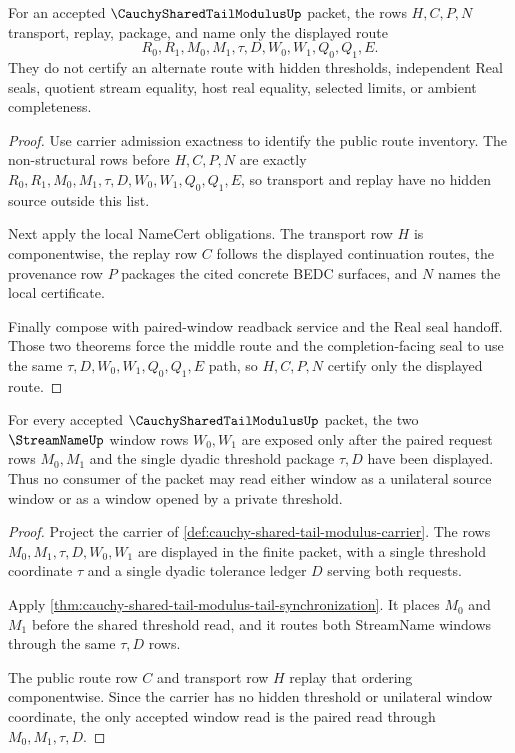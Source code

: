 \begin{theorem}
\label{thm:cauchy-shared-tail-modulus-route-replay-provenance}
For an accepted $\CauchySharedTailModulusUp$ packet, the rows $H,C,P,N$ transport, replay, package, and name only the displayed route
$$
R_0,R_1,M_0,M_1,\tau,D,W_0,W_1,Q_0,Q_1,E.
$$
They do not certify an alternate route with hidden thresholds, independent Real seals, quotient stream equality, host real equality, selected limits, or ambient completeness.
\end{theorem}
\begin{proof}
Use carrier admission exactness to identify the public route inventory. The non-structural rows before $H,C,P,N$ are exactly $R_0,R_1,M_0,M_1,\tau,D,W_0,W_1,Q_0,Q_1,E$, so transport and replay have no hidden source outside this list.

Next apply the local NameCert obligations. The transport row $H$ is componentwise, the replay row $C$ follows the displayed continuation routes, the provenance row $P$ packages the cited concrete BEDC surfaces, and $N$ names the local certificate.

Finally compose with paired-window readback service and the Real seal handoff. Those two theorems force the middle route and the completion-facing seal to use the same $\tau,D,W_0,W_1,Q_0,Q_1,E$ path, so $H,C,P,N$ certify only the displayed route.
\end{proof}

\begin{theorem}
\label{thm:cauchy-shared-tail-modulus-paired-window-obligation}
For every accepted $\CauchySharedTailModulusUp$ packet, the two $\StreamNameUp$ window rows $W_0,W_1$ are exposed only after the paired request rows $M_0,M_1$ and the single dyadic threshold package $\tau,D$ have been displayed. Thus no consumer of the packet may read either window as a unilateral source window or as a window opened by a private threshold.
\end{theorem}
\begin{proof}
Project the carrier of \autoref{def:cauchy-shared-tail-modulus-carrier}. The rows $M_0,M_1,\tau,D,W_0,W_1$ are displayed in the finite packet, with a single threshold coordinate $\tau$ and a single dyadic tolerance ledger $D$ serving both requests.

Apply \autoref{thm:cauchy-shared-tail-modulus-tail-synchronization}. It places $M_0$ and $M_1$ before the shared threshold read, and it routes both StreamName windows through the same $\tau,D$ rows.

The public route row $C$ and transport row $H$ replay that ordering componentwise. Since the carrier has no hidden threshold or unilateral window coordinate, the only accepted window read is the paired read through $M_0,M_1,\tau,D$.
\end{proof}

